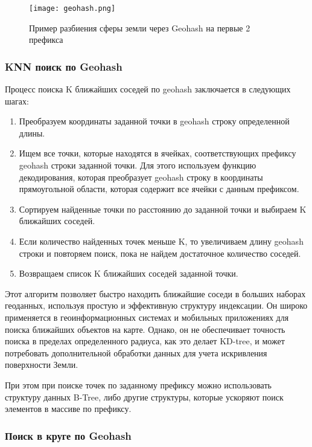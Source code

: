 \begin{figure}[h]
    \centering
    \texttt{[image: geohash.png]}
    \caption{Пример разбиения сферы земли через Geohash на первые 2 префикса}
\end{figure}

\subsubsection{KNN поиск по Geohash}
Процесс поиска K ближайших соседей по geohash заключается в следующих шагах:
\begin{enumerate}
    \item Преобразуем координаты заданной точки в geohash строку определенной длины.
    \item Ищем все точки, которые находятся в ячейках, соответствующих префиксу geohash строки заданной точки. Для этого используем функцию декодирования, которая преобразует geohash строку в координаты прямоугольной области, которая содержит все ячейки с данным префиксом.
    \item Сортируем найденные точки по расстоянию до заданной точки и выбираем K ближайших соседей.
    \item Если количество найденных точек меньше K, то увеличиваем длину geohash строки и повторяем поиск, пока не найдем достаточное количество соседей.
    \item Возвращаем список K ближайших соседей заданной точки.
\end{enumerate}

Этот алгоритм позволяет быстро находить ближайшие соседи в больших наборах геоданных, используя простую и эффективную структуру индексации. Он широко применяется в геоинформационных системах и мобильных приложениях для поиска ближайших объектов на карте. Однако, он не обеспечивает точность поиска в пределах определенного радиуса, как это делает KD-tree, и может потребовать дополнительной обработки данных для учета искривления поверхности Земли.

При этом при поиске точек по заданному префиксу можно использовать структуру данных B-Tree, либо другие структуры, которые ускоряют поиск элементов в массиве по префиксу.

\subsubsection{Поиск в круге по Geohash}

